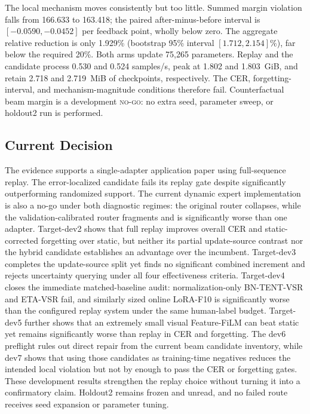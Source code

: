 The local mechanism moves consistently but too little. Summed margin violation falls from 166.633 to 163.418; the paired after-minus-before interval is $[-0.0590,-0.0452]$ per feedback point, wholly below zero. The aggregate relative reduction is only 1.929\% (bootstrap 95\% interval $[1.712,2.154]\%$), far below the required 20\%. Both arms update 75,265 parameters. Replay and the candidate process 0.530 and 0.524 samples/s, peak at 1.802 and 1.803~GiB, and retain 2.718 and 2.719~MiB of checkpoints, respectively. The CER, forgetting-interval, and mechanism-magnitude conditions therefore fail. Counterfactual beam margin is a development \textsc{no-go}: no extra seed, parameter sweep, or holdout2 run is performed.

\subsection{Current Decision}

The evidence supports a single-adapter application paper using full-sequence replay. The error-localized candidate fails its replay gate despite significantly outperforming randomized support. The current dynamic expert implementation is also a no-go under both diagnostic regimes: the original router collapses, while the validation-calibrated router fragments and is significantly worse than one adapter. Target-dev2 shows that full replay improves overall CER and static-corrected forgetting over static, but neither its partial update-source contrast nor the hybrid candidate establishes an advantage over the incumbent. Target-dev3 completes the update-source split yet finds no significant combined increment and rejects uncertainty querying under all four effectiveness criteria. Target-dev4 closes the immediate matched-baseline audit: normalization-only BN-TENT-VSR and ETA-VSR fail, and similarly sized online LoRA-F10 is significantly worse than the configured replay system under the same human-label budget. Target-dev5 further shows that an extremely small visual Feature-FiLM can beat static yet remains significantly worse than replay in CER and forgetting. The dev6 preflight rules out direct repair from the current beam candidate inventory, while dev7 shows that using those candidates as training-time negatives reduces the intended local violation but not by enough to pass the CER or forgetting gates. These development results strengthen the replay choice without turning it into a confirmatory claim. Holdout2 remains frozen and unread, and no failed route receives seed expansion or parameter tuning.
